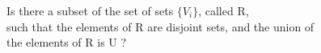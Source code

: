 \documentclass[preview]{standalone}
\begin{document}
\begin{center}
Is there a subset of the set of sets $\{V_i\}$, called R, \\such that the elements of R are disjoint sets, and the union of \\the elements of R is U ?
\end{center}
\end{document}
